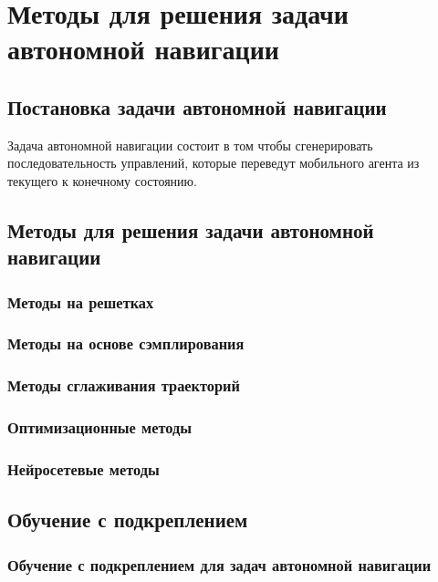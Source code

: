\chapter{Методы для решения задачи автономной навигации}\label{ch:ch1}

\section{Постановка задачи автономной навигации}\label{sec:ch1/sec1}

Задача автономной навигации состоит в том чтобы сгенерировать последовательность управлений, которые переведут мобильного агента из текущего к конечному состоянию.

\section{Методы для решения задачи автономной навигации}\label{sec:ch1/sec2}

\subsection{Методы на решетках}

\subsection{Методы на основе сэмплирования}

\subsection{Методы сглаживания траекторий}

\subsection{Оптимизационные методы}

\subsection{Нейросетевые методы}

\section{Обучение с подкреплением}

\subsection{Обучение с подкреплением для задач автономной навигации}


